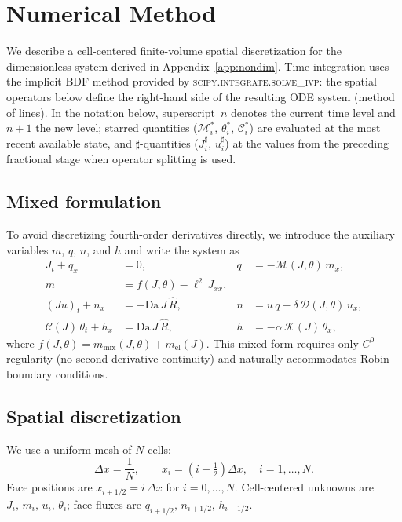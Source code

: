 \documentclass[aps,pre,reprint,superscriptaddress,longbibliography,floatfix]{revtex4-2}
\newcommand{\Ms}{\mathcal{M}}
\newcommand{\Ds}{\mathcal{D}}
\newcommand{\Cs}{\mathcal{C}}
\newcommand{\Ks}{\mathcal{K}}
\newcommand{\Da}{\mathrm{Da}}
\newcommand{\Rhat}{\widehat{R}}
\begin{document}
\section{Numerical Method}
\label{app:numerics}

We describe a cell-centered finite-volume spatial discretization for the
dimensionless system derived in Appendix~\ref{app:nondim}.  Time
integration uses the implicit BDF method provided by
\textsc{scipy.integrate.solve\_ivp}: the spatial operators below
define the right-hand side of the resulting ODE system (method of
lines).  In the notation below, superscript~$n$ denotes the current
time level and~$n\!+\!1$ the new level; starred quantities
($\Ms_i^*$, $\theta_i^*$, $\Cs_i^*$) are evaluated at the most
recent available state, and $\sharp$-quantities ($J_i^\sharp$,
$u_i^\sharp$) at the values from the preceding fractional stage when
operator splitting is used.

\subsection{Mixed formulation}

To avoid discretizing fourth-order derivatives directly, we introduce the auxiliary variables $m$, $q$, $n$, and $h$ and write the system as
\begin{align}
  J_t + q_x &= 0, & q &= -\Ms(J,\theta)\,m_x, \label{eq:mixed_J} \\
  m &= f(J,\theta) - \ell^2\,J_{xx}, \label{eq:mixed_m} \\
  (Ju)_t + n_x &= -\Da\,J\,\Rhat, & n &= u\,q - \delta\,\Ds(J,\theta)\,u_x, \label{eq:mixed_u} \\
  \Cs(J)\,\theta_t + h_x &= \Da\,J\,\Rhat, & h &= -\alpha\,\Ks(J)\,\theta_x, \label{eq:mixed_T}
\end{align}
where $f(J,\theta) = m_\mathrm{mix}(J,\theta) + m_\mathrm{el}(J)$. This mixed form requires only $C^0$ regularity (no second-derivative continuity) and naturally accommodates Robin boundary conditions.

\subsection{Spatial discretization}

We use a uniform mesh of $N$ cells:
\begin{equation}
  \Delta x = \frac{1}{N},
  \qquad
  x_i = \left(i - \tfrac{1}{2}\right)\Delta x,
  \quad i = 1,\dots,N.
  \label{eq:mesh}
\end{equation}
Face positions are $x_{i+1/2} = i\,\Delta x$ for $i=0,\dots,N$. Cell-centered unknowns are $J_i,\,m_i,\,u_i,\,\theta_i$; face fluxes are $q_{i+1/2},\,n_{i+1/2},\,h_{i+1/2}$.
\end{document}
